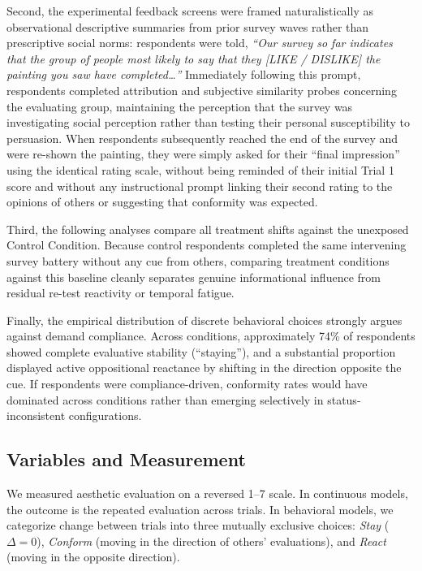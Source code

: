 \documentclass[12pt, letterpaper]{article}
\begin{document}
Second, the experimental feedback screens were framed naturalistically as observational descriptive summaries from prior survey waves rather than prescriptive social norms: respondents were told, \textit{``Our survey so far indicates that the group of people most likely to say that they [LIKE / DISLIKE] the painting you saw have completed\dots''} Immediately following this prompt, respondents completed attribution and subjective similarity probes concerning the evaluating group, maintaining the perception that the survey was investigating social perception rather than testing their personal susceptibility to persuasion. When respondents subsequently reached the end of the survey and were re-shown the painting, they were simply asked for their ``final impression'' using the identical rating scale, without being reminded of their initial Trial 1 score and without any instructional prompt linking their second rating to the opinions of others or suggesting that conformity was expected.

Third, the following analyses compare all treatment shifts against the unexposed Control Condition. Because control respondents completed the same intervening survey battery without any cue from others, comparing treatment conditions against this baseline cleanly separates genuine informational influence from residual re-test reactivity or temporal fatigue.

Finally, the empirical distribution of discrete behavioral choices strongly argues against demand compliance. Across conditions, approximately 74\% of respondents showed complete evaluative stability (``staying''), and a substantial proportion displayed active oppositional reactance by shifting in the direction opposite the cue. If respondents were compliance-driven, conformity rates would have dominated across conditions rather than emerging selectively in status-inconsistent configurations.

\subsection{Variables and Measurement}
We measured aesthetic evaluation on a reversed 1--7 scale. In continuous models, the outcome is the repeated evaluation across trials. In behavioral models, we categorize change between trials into three mutually exclusive choices: \textit{Stay} ($\Delta = 0$), \textit{Conform} (moving in the direction of others' evaluations), and \textit{React} (moving in the opposite direction).
\end{document}
